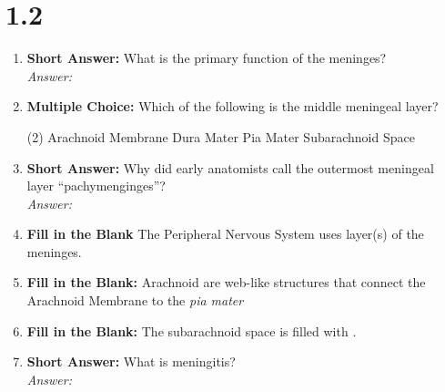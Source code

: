 \section*{1.2 \squigglyline}
\begin{enumerate}[label=\textbf{Q1.2.\arabic*}]
      \item \textbf{Short Answer:} What is the primary function of the meninges? \\
            \textit{Answer:} \\%

      \item \textbf{Multiple Choice:} Which of the following is the middle meningeal layer?
            \begin{tasks}[label=(\Alph*), label-width=1.5em, item-indent=1.7em](2) %
                  \task Arachnoid Membrane
                  \task Dura Mater
                  \task Pia Mater
                  \task Subarachnoid Space
            \end{tasks}

      \item \textbf{Short Answer:} Why did early anatomists call the outermost meningeal layer ``pachymenginges''? \\
            \textit{Answer:} \\%

      \item \textbf{Fill in the Blank} The Peripheral Nervous System uses \underline{\hspace{3cm}} layer(s) of the meninges. \\

      \item \textbf{Fill in the Blank:} Arachnoid \underline{\hspace{3cm}} are web-like structures that connect the Arachnoid Membrane to the \textit{pia mater}

      \item \textbf{Fill in the Blank:} The subarachnoid space is filled with \underline{\hspace{3cm}}. \\

      \item \textbf{Short Answer:} What is meningitis? \\
            \textit{Answer:} \\%


\end{enumerate}
